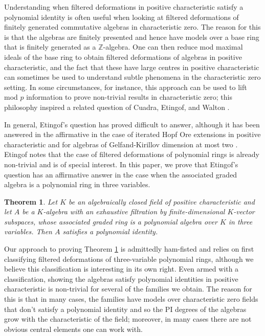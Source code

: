 \documentclass[a4paper,11pt,twoside,notitlepage,reqno]{amsart}
\theoremstyle{plain}
\newtheorem{thm}{Theorem}
\numberwithin{thm}{section}
\theoremstyle{definition}
\begin{document}
Understanding when filtered deformations in positive characteristic satisfy a polynomial identity is often useful when looking at filtered deformations of finitely generated commutative algebras in characteristic zero. The reason for this is that the algebras are finitely presented and hence have models over a base ring that is finitely generated as a $\mathbb{Z}$-algebra.  One can then reduce mod maximal ideals of the base ring to obtain filtered deformations of algebras in positive characteristic, and the fact that these have large centres in positive characteristic can sometimes be used to understand subtle phenomena in the characteristic zero setting. In some circumstances, for instance, this approach can be used to lift mod $p$ information to prove non-trivial results in characteristic zero; this philosophy inspired a related question of Cuadra, Etingof, and Walton \cite{CEW}.   

In general, Etingof's question has proved difficult to answer, although it has been answered in the affirmative in the case of iterated Hopf Ore extensions in positive characteristic \cite{BZ} and for algebras of Gelfand-Kirillov dimension at most two \cite{Bell}.  Etingof \cite{Etingof} notes that the case of filtered deformations of polynomial rings is already non-trivial and is of special interest. In this paper, we prove that Etingof's question has an affirmative answer in the case when the associated graded algebra is a polynomial ring in three variables.  
\begin{thm}
Let $K$ be an algebraically closed field of positive characteristic and let $A$ be a $K$-algebra with an exhaustive filtration by finite-dimensional $K$-vector subspaces, whose associated graded ring is a polynomial algebra over $K$ in three variables.  Then $A$ satisfies a polynomial identity.
\label{thm:main2}
\end{thm}

Our approach to proving Theorem \ref{thm:main2} is admittedly ham-fisted and relies on first classifying filtered deformations of three-variable polynomial rings, although we believe this classification is interesting in its own right.  Even armed with a classification, showing the algebras satisfy polynomial identities in positive characteristic is non-trivial for several of the families we obtain.  The reason for this is that in many cases, the families have models over characteristic zero fields that don't satisfy a polynomial identity and so the PI degrees of the algebras grow with the characteristic of the field; moreover, in many cases there are not obvious central elements one can work with. 
\end{document}
